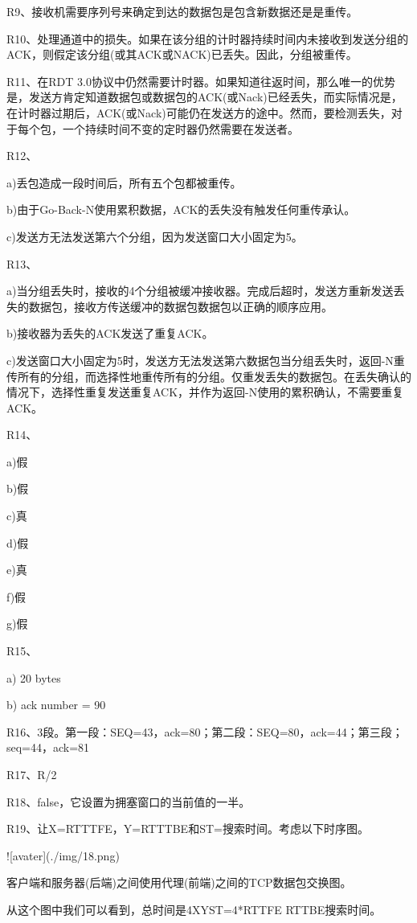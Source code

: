 \documentclass[11pt,UTF8,twoside]{article}
\begin{document}
	R9、接收机需要序列号来确定到达的数据包是包含新数据还是是重传。
	
	R10、处理通道中的损失。如果在该分组的计时器持续时间内未接收到发送分组的ACK，则假定该分组(或其ACK或NACK)已丢失。因此，分组被重传。
	
	R11、在RDT 3.0协议中仍然需要计时器。如果知道往返时间，那么唯一的优势是，发送方肯定知道数据包或数据包的ACK(或Nack)已经丢失，而实际情况是，在计时器过期后，ACK(或Nack)可能仍在发送方的途中。然而，要检测丢失，对于每个包，一个持续时间不变的定时器仍然需要在发送者。
	
	R12、
	
	a)丢包造成一段时间后，所有五个包都被重传。
	
	b)由于Go-Back-N使用累积数据，ACK的丢失没有触发任何重传承认。
	
	c)发送方无法发送第六个分组，因为发送窗口大小固定为5。
	
	R13、
	
	a)当分组丢失时，接收的4个分组被缓冲接收器。完成后超时，发送方重新发送丢失的数据包，接收方传送缓冲的数据包数据包以正确的顺序应用。
	
	b)接收器为丢失的ACK发送了重复ACK。
	
	c)发送窗口大小固定为5时，发送方无法发送第六数据包当分组丢失时，返回-N重传所有的分组，而选择性地重传所有的分组。仅重发丢失的数据包。在丢失确认的情况下，选择性重复发送重复ACK，并作为返回-N使用的累积确认，不需要重复ACK。
	
	R14、
	
	a)假
	
	b)假
	
	c)真
	
	d)假
	
	e)真
	
	f)假
	
	g)假
	
	R15、
	
	a) 20 bytes 
	
	b) ack number = 90 
	
	R16、3段。第一段：SEQ=43，ack=80；第二段：SEQ=80，ack=44；第三段；seq=44，ack=81
	
	R17、R/2 
	
	R18、false，它设置为拥塞窗口的当前值的一半。
	
	R19、让X=RTTTFE，Y=RTTTBE和ST=搜索时间。考虑以下时序图。
	
	![avater](./img/18.png)
	
	客户端和服务器(后端)之间使用代理(前端)之间的TCP数据包交换图。
	
	从这个图中我们可以看到，总时间是4XYST=4*RTTFE RTTBE搜索时间。
	
\end{document}
